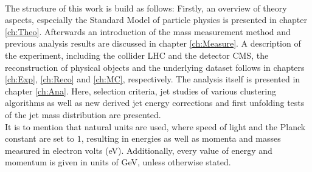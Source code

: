	\\
	The structure of this work is build as follows: Firstly, an overview of theory aspects, especially the Standard Model of particle physics is presented in chapter \ref{ch:Theo}. Afterwards an introduction of the mass measurement method and previous analysis results are discussed in chapter \ref{ch:Measure}. A description of the experiment, including the collider LHC and the detector CMS, the reconstruction of physical objects and the underlying dataset follows in chapters \ref{ch:Exp}, \ref{ch:Reco} and \ref{ch:MC}, respectively. The analysis itself is presented in chapter \ref{ch:Ana}. Here, selection criteria, jet studies of various clustering algorithms as well as new derived jet energy corrections and first unfolding tests of the jet mass distribution are presented.
	\\
	It is to mention that natural units are used, where speed of light and the Planck constant are set to $1$, resulting in energies as well as momenta and masses measured in electron volts (eV). Additionally, every value of energy and momentum is given in units of GeV, unless otherwise stated.